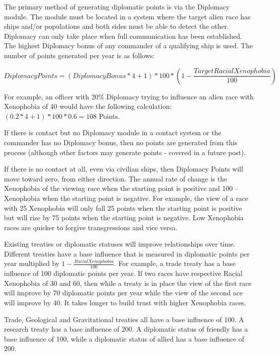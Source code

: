 \documentclass[10pt,a4paper,oneside]{article}
\begin{document}
The primary method of generating diplomatic points is via the Diplomacy module. The module must be located in a system where the target alien race has ships and/or populations and both sides must be able to detect the other. Diplomacy can only take place when full communication has been established. The highest Diplomacy bonus of any commander of a qualifying ship is used. The number of points generated per year is as follows:

\[ Diplomacy Points = (Diplomacy Bonus * 4 + 1) * 100 * (1 - \frac{Target Racial Xenophobia}{100}) \]

For example, an officer with 20\% Diplomacy trying to influence an alien race with Xenophobia of 40 would have the following calculation: \( (0.2 * 4 + 1) * 100 * 0.6 = 108 \) Points.

If there is contact but no Diplomacy module in a contact system or the commander has no Diplomacy bonus, then no points are generated from this process (although other factors may generate points - covered in a future post).

If there is no contact at all, even via civilian ships, then Diplomacy Points will move toward zero, from either direction. The annual rate of change is the Xenophobia of the viewing race when the starting point is positive and 100 – Xenophobia when the starting point is negative. For example, the view of a race with 25 Xenophobia will only fall 25 points when the starting point is positive but will rise by 75 points when the starting point is negative. Low Xenophobia races are quicker to forgive transgressions and vice versa.

Existing treaties or diplomatic statuses will improve relationships over time. Different treaties have a base influence that is measured in diplomatic points per year multiplied by \( 1 - \frac{Racial Xenophobia}{100} \). For example, a trade treaty has a base influence of 100 diplomatic points per year. If two races have respective Racial Xenophobia of 30 and 60, then while a treaty is in place the view of the first race will improve by 70 diplomatic points per year while the view of the second ace will improve by 40. It takes longer to build trust with higher Xenophobia races.

Trade, Geological and Gravitational treaties all have a base influence of 100. A research treaty has a base influence of 200. A diplomatic status of friendly has a base influence of 100, while a diplomatic status of allied has a base influence of 200.
\end{document}
